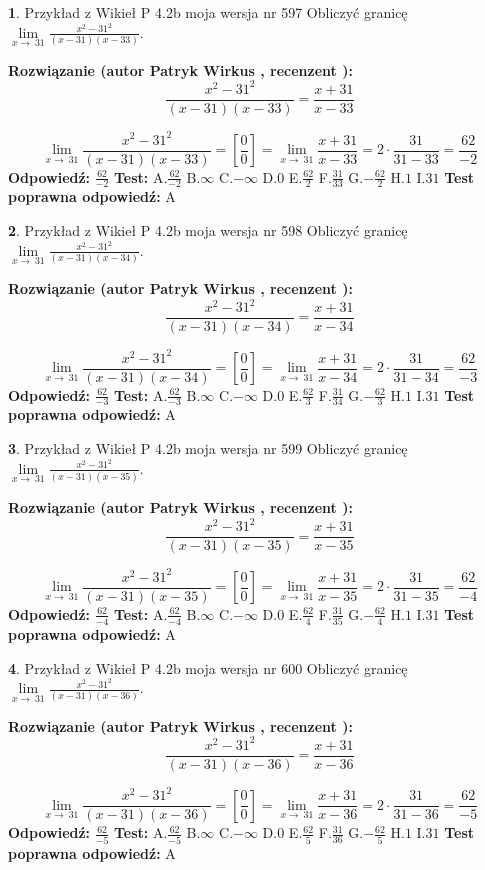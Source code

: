 \documentclass[12pt, a4paper]{article}
\theoremstyle{definition} %
\newtheorem{zad}{}
\newcommand{\zadStart}[1]{\begin{zad}#1\newline}
\newcommand{\zadStop}{\end{zad}}
\newcommand{\rozwStart}[2]{\noindent \textbf{Rozwiązanie (autor #1 , recenzent #2): }\newline}
\newcommand{\rozwStop}{\newline}
\newcommand{\odpStart}{\noindent \textbf{Odpowiedź:}\newline}
\newcommand{\odpStop}{\newline}
\newcommand{\testStart}{\noindent \textbf{Test:}\newline}
\newcommand{\testStop}{\newline}
\newcommand{\kluczStart}{\noindent \textbf{Test poprawna odpowiedź:}\newline}
\newcommand{\kluczStop}{\newline}
\begin{document}
\zadStart{Przykład z Wikieł P 4.2b moja wersja nr 597}
Obliczyć granicę $\lim\limits_{x\to\ 31}\frac{x^{2}-31^{2}}{(x-31)(x-33)}$.
\zadStop
\rozwStart{Patryk Wirkus}{}
$$\frac{x^{2}-31^{2}}{(x-31)(x-33)}=\frac{x+31}{x-33}$$

$$\lim\limits_{x\to\ 31}\frac{x^{2}-31^{2}}{(x-31)(x-33)}=[\frac{0}{0}]=\lim\limits_{x\to\ 31}\frac{x+31}{x-33}=2 \cdot \frac{31}{31-33} = \frac{62}{-2}$$
\rozwStop
\odpStart
$\frac{62}{-2}$
\odpStop
\testStart
A.$\frac{62}{-2}$
B.$\infty$
C.$-\infty$
D.$0$
E.$\frac{62}{2}$
F.$\frac{31}{33}$
G.$-\frac{62}{2}$
H.$1$
I.$31$
\testStop
\kluczStart
A
\kluczStop



\zadStart{Przykład z Wikieł P 4.2b moja wersja nr 598}
Obliczyć granicę $\lim\limits_{x\to\ 31}\frac{x^{2}-31^{2}}{(x-31)(x-34)}$.
\zadStop
\rozwStart{Patryk Wirkus}{}
$$\frac{x^{2}-31^{2}}{(x-31)(x-34)}=\frac{x+31}{x-34}$$

$$\lim\limits_{x\to\ 31}\frac{x^{2}-31^{2}}{(x-31)(x-34)}=[\frac{0}{0}]=\lim\limits_{x\to\ 31}\frac{x+31}{x-34}=2 \cdot \frac{31}{31-34} = \frac{62}{-3}$$
\rozwStop
\odpStart
$\frac{62}{-3}$
\odpStop
\testStart
A.$\frac{62}{-3}$
B.$\infty$
C.$-\infty$
D.$0$
E.$\frac{62}{3}$
F.$\frac{31}{34}$
G.$-\frac{62}{3}$
H.$1$
I.$31$
\testStop
\kluczStart
A
\kluczStop



\zadStart{Przykład z Wikieł P 4.2b moja wersja nr 599}
Obliczyć granicę $\lim\limits_{x\to\ 31}\frac{x^{2}-31^{2}}{(x-31)(x-35)}$.
\zadStop
\rozwStart{Patryk Wirkus}{}
$$\frac{x^{2}-31^{2}}{(x-31)(x-35)}=\frac{x+31}{x-35}$$

$$\lim\limits_{x\to\ 31}\frac{x^{2}-31^{2}}{(x-31)(x-35)}=[\frac{0}{0}]=\lim\limits_{x\to\ 31}\frac{x+31}{x-35}=2 \cdot \frac{31}{31-35} = \frac{62}{-4}$$
\rozwStop
\odpStart
$\frac{62}{-4}$
\odpStop
\testStart
A.$\frac{62}{-4}$
B.$\infty$
C.$-\infty$
D.$0$
E.$\frac{62}{4}$
F.$\frac{31}{35}$
G.$-\frac{62}{4}$
H.$1$
I.$31$
\testStop
\kluczStart
A
\kluczStop



\zadStart{Przykład z Wikieł P 4.2b moja wersja nr 600}
Obliczyć granicę $\lim\limits_{x\to\ 31}\frac{x^{2}-31^{2}}{(x-31)(x-36)}$.
\zadStop
\rozwStart{Patryk Wirkus}{}
$$\frac{x^{2}-31^{2}}{(x-31)(x-36)}=\frac{x+31}{x-36}$$

$$\lim\limits_{x\to\ 31}\frac{x^{2}-31^{2}}{(x-31)(x-36)}=[\frac{0}{0}]=\lim\limits_{x\to\ 31}\frac{x+31}{x-36}=2 \cdot \frac{31}{31-36} = \frac{62}{-5}$$
\rozwStop
\odpStart
$\frac{62}{-5}$
\odpStop
\testStart
A.$\frac{62}{-5}$
B.$\infty$
C.$-\infty$
D.$0$
E.$\frac{62}{5}$
F.$\frac{31}{36}$
G.$-\frac{62}{5}$
H.$1$
I.$31$
\testStop
\kluczStart
A
\kluczStop
\end{document}
